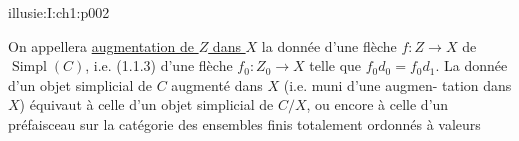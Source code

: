 \begin{illusiebodypage}{illusie:I:ch1:p002}
\hypertarget{illusie:I:ch1:s1:1:eq3}{}%
\noindent{}\par

\hypertarget{illusie:I:ch1:s1:1:p5}{}%
On appellera \underline{augmentation de $Z$ dans $X$} la donnée d'une flèche
$f:Z\longrightarrow X$ de $\operatorname{Simpl}(C)$, i.e. (1.1.3) d'une flèche
$f_0:Z_0\longrightarrow X$ telle que $f_0d_0=f_0d_1$. La donnée d'un objet
simplicial de $C$ augmenté dans $X$ (i.e. muni d'une augmen- tation dans $X$)
équivaut à celle d'un objet simplicial de $C/X$, ou encore à celle d'un
préfaisceau sur la catégorie des ensembles finis totalement ordonnés à valeurs
\end{illusiebodypage}
